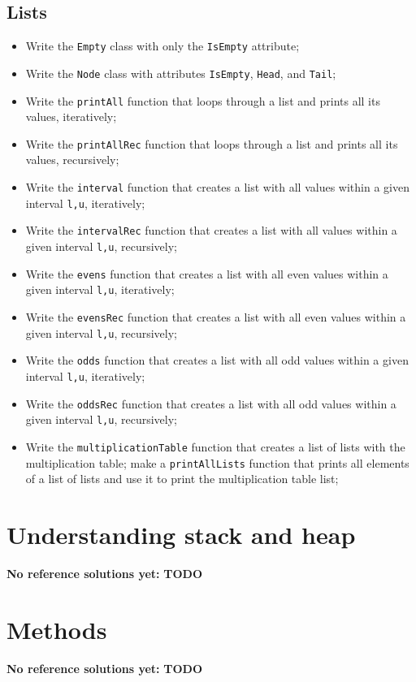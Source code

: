 		\subsection{Lists}
		\begin{itemize}
			\item Write the \texttt{Empty} class with only the \texttt{IsEmpty} attribute;
			\item Write the \texttt{Node} class with attributes \texttt{IsEmpty}, \texttt{Head}, and \texttt{Tail};
			\item Write the \texttt{printAll} function that loops through a list and prints all its values, iteratively;
			\item Write the \texttt{printAllRec} function that loops through a list and prints all its values, recursively;
			\item Write the \texttt{interval} function that creates a list with all values within a given interval \texttt{l,u}, iteratively;
			\item Write the \texttt{intervalRec} function that creates a list with all values within a given interval \texttt{l,u}, recursively;
			\item Write the \texttt{evens} function that creates a list with all even values within a given interval \texttt{l,u}, iteratively;
			\item Write the \texttt{evensRec} function that creates a list with all even values within a given interval \texttt{l,u}, recursively;
			\item Write the \texttt{odds} function that creates a list with all odd values within a given interval \texttt{l,u}, iteratively;
			\item Write the \texttt{oddsRec} function that creates a list with all odd values within a given interval \texttt{l,u}, recursively;
			\item Write the \texttt{multiplicationTable} function that creates a list of lists with the multiplication table; make a \texttt{printAllLists} function that prints all elements of a list of lists and use it to print the multiplication table list;
		\end{itemize}

    \section{Understanding stack and heap}
        \textbf{No reference solutions yet:}
        \textbf{TODO}

    \section{Methods}
        \textbf{No reference solutions yet:}
        \textbf{TODO}

